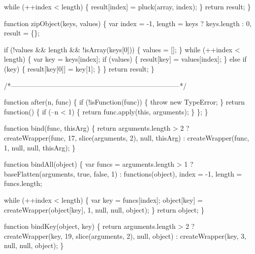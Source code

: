 \begin{DoxyCodeInclude}
      \textcolor{keywordflow}{while} (++index < length) \{
        result[index] = pluck(array, index);
      \}
      \textcolor{keywordflow}{return} result;
    \}

    \textcolor{keyword}{function} zipObject(keys, values) \{
      var index = -1,
          length = keys ? keys.length : 0,
          result = \{\};

      \textcolor{keywordflow}{if} (!values && length && !isArray(keys[0])) \{
        values = [];
      \}
      \textcolor{keywordflow}{while} (++index < length) \{
        var key = keys[index];
        \textcolor{keywordflow}{if} (values) \{
          result[key] = values[index];
        \} \textcolor{keywordflow}{else} \textcolor{keywordflow}{if} (key) \{
          result[key[0]] = key[1];
        \}
      \}
      \textcolor{keywordflow}{return} result;
    \}

    \textcolor{comment}{/*--------------------------------------------------------------------------*/}

    \textcolor{keyword}{function} after(n, func) \{
      \textcolor{keywordflow}{if} (!isFunction(func)) \{
        \textcolor{keywordflow}{throw} \textcolor{keyword}{new} TypeError;
      \}
      \textcolor{keywordflow}{return} \textcolor{keyword}{function}() \{
        \textcolor{keywordflow}{if} (--n < 1) \{
          \textcolor{keywordflow}{return} func.apply(\textcolor{keyword}{this}, arguments);
        \}
      \};
    \}

    \textcolor{keyword}{function} bind(func, thisArg) \{
      \textcolor{keywordflow}{return} arguments.length > 2
        ? createWrapper(func, 17, slice(arguments, 2), null, thisArg)
        : createWrapper(func, 1, null, null, thisArg);
    \}

    \textcolor{keyword}{function} bindAll(\textcolor{keywordtype}{object}) \{
      var funcs = arguments.length > 1 ? baseFlatten(arguments, \textcolor{keyword}{true}, \textcolor{keyword}{false}, 1) : functions(object),
          index = -1,
          length = funcs.length;

      \textcolor{keywordflow}{while} (++index < length) \{
        var key = funcs[index];
        \textcolor{keywordtype}{object}[key] = createWrapper(\textcolor{keywordtype}{object}[key], 1, null, null, \textcolor{keywordtype}{object});
      \}
      \textcolor{keywordflow}{return} object;
    \}

    \textcolor{keyword}{function} bindKey(\textcolor{keywordtype}{object}, key) \{
      \textcolor{keywordflow}{return} arguments.length > 2
        ? createWrapper(key, 19, slice(arguments, 2), null, \textcolor{keywordtype}{object})
        : createWrapper(key, 3, null, null, object);
    \}


\end{DoxyCodeInclude}
